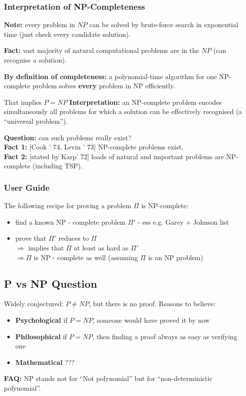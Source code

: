 \documentclass{scrartcl}
\begin{document}
\subsubsection{Interpretation of NP-Completeness}
\label{sec:16-3-1}
{\bf Note: } every problem in $NP$ can be solved by brute-force search in
exponential time (just check every candidate solution). 

{\bf Fact: } vast majority of natural computational problems are in the $NP$
(can recognise a solution).

{\bf By definition of completeness: } a polynomial-time algorithm for one
NP-complete problem solves {\bf every } problem in NP efficiently.

That implies $P = NP$
{\bf Interpretation: } an NP-complete problem encodes simultaneously all
problems for which a solution can be effectively recognised (a ``universal
problem''). 

{\bf Question: } can such problems really exist? \\
{\bf Fact 1: } [Cook ' 74, Levin ' 73] NP-complete problems exist.\\
{\bf Fact 2: } [stated by Karp' 72] loads of natural and important problems are
NP-complete (including TSP).
\subsubsection{User Guide}
\label{sec:16-4-1}
The following recipe for proving a problem $\Pi$ is NP-complete:\\
\begin{itemize}
\item find a known NP - complete problem $\Pi '$ - ess e.g. Garey + Johnson list
\item prove that $\Pi '$ reduces to $\Pi$ \\
$\Rightarrow$ implies that $\Pi$ at least as hard as $\Pi '$\\
$\Rightarrow \Pi$ is NP - complete as well (assuming $\Pi$ is an NP problem)
\end{itemize}
\subsection{P vs NP Question}
\label{sec:16-5}
Widely conjectured: $P \neq NP$, but there is no proof. Reasons to believe:
\begin{itemize}
\item {\bf Psychological } if $P=NP$, someone would have proved it by now
\item {\bf Philosophical } if $P=NP$, then finding a proof always as easy as
  verifying one
\item {\bf Mathematical } ???
\end{itemize}
{\bf FAQ: } NP stands not for ``Not polynomial'' but for ``non-deterministic
polynomial''. 
\end{document}
